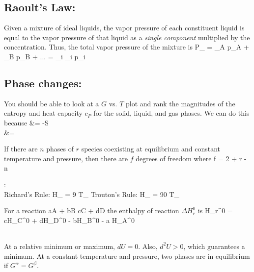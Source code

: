 \documentclass[12pt]{article}
\begin{document}
\subsection{Raoult's Law:}
Given a mixture of ideal liquids, the vapor pressure of each constituent liquid is equal to the vapor pressure of that liquid as a \emph{single component} multiplied by the concentration.  Thus, the total vapor pressure of the mixture is 
\eqs
P_ = \chi_A p_A + \chi_B p_B + ... = \sum_i \chi_i p_i
\eqe

\subsection{Phase changes:}
You should be able to look at a $G$ vs. $T$ plot and rank the magnitudes of the entropy and heat capacity $c_P$ for the solid, liquid, and gas phases.  We can do this because
\eqs
{} &= -S\\
 &= 
\eqe

 If there are $n$ phases of $r$ species coexisting at equilibrium and constant temperature and pressure, then there are $f$ degrees of freedom where
\eqs
f = 2 + r - n
\eqe

:\\

Richard's Rule:
\eqs
\Delta H_ = 9 T_
\eqe
Trouton's Rule:
\eqs
\Delta H_ = 90 T_
\eqe

For a reaction
\eqs
aA + bB \rightarrow cC + dD
\eqe
the enthalpy of reaction $\Delta H_r^0$ is
\eqs
\Delta H_r^0 = c\Delta H_C^0 + d\Delta H_D^0 - b\Delta H_B^0 - a \Delta H_A^0
\eqe

\\
At a relative minimum or maximum, $dU = 0$.  Also, $d^2U > 0$, which guarantees a minimum.  At a constant temperature and pressure, two phases are in equilibrium if $G^\alpha = G^\beta$.

\end{document}
